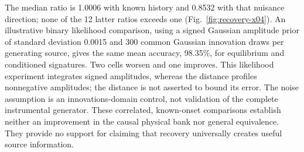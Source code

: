 The median ratio is 1.0006 with known history and 0.8532 with that nuisance
direction; none of the 12 latter ratios exceeds one
(Fig.~\ref{fig:recovery-x04}). An illustrative binary likelihood comparison,
using a signed Gaussian amplitude prior of standard deviation 0.0015 and
300 common Gaussian innovation draws per generating source, gives the
same mean accuracy, 98.35\%, for equilibrium and conditioned signatures.
Two cells worsen and one improves. This likelihood experiment integrates
signed amplitudes, whereas the distance profiles nonnegative amplitudes;
the distance is not asserted to bound its error. The noise assumption is
an innovations-domain control, not validation of the complete instrumental
generator. These correlated, known-onset comparisons establish neither
an improvement in the causal physical bank nor general equivalence. They provide no support for
claiming that recovery universally creates useful source information.
